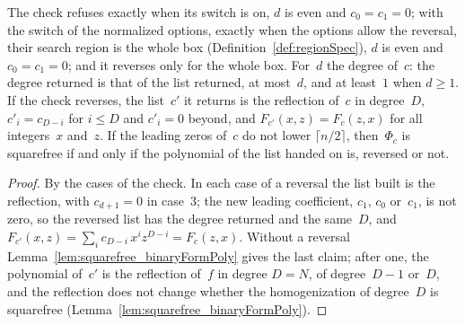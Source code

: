 \begin{lemma}\label{lem:reversal_swap}
  \leanok
  The check refuses exactly when its switch is on, $d$ is even and $c_0 = c_1 = 0$; with the switch
  of the normalized options, exactly when the options allow the reversal, their search region is the
  whole box (Definition~\ref{def:regionSpec}), $d$ is even and $c_0 = c_1 = 0$; and it reverses only
  for the whole box. For~$d$ the degree of~$c$: the degree returned is that of the list returned, at
  most~$d$, and at least~$1$ when $d \ge 1$. If the check reverses, the list~$c'$ it returns is the
  reflection of~$c$ in degree~$D$, $c'_i = c_{D-i}$ for $i \le D$ and $c'_i = 0$ beyond, and
  $F_{c'}(x, z) = F_c(z, x)$ for all integers~$x$ and~$z$. If the leading zeros of~$c$ do not lower
  $\lceil n/2 \rceil$, then~$\Phi_c$ is squarefree if and only if the polynomial of the list handed
  on is, reversed or not.
\end{lemma}

\begin{proof}
  \leanok
  By the cases of the check. In each case of a reversal the list built is the reflection, with
  $c_{d+1} = 0$ in case~3; the new leading coefficient, $c_1$, $c_0$ or~$c_1$, is not zero, so the
  reversed list has the degree returned and the same~$D$, and
  $F_{c'}(x, z) = \sum_i c_{D-i}\, x^i z^{D-i} = F_c(z, x)$. Without a reversal
  Lemma~\ref{lem:squarefree_binaryFormPoly} gives the last claim; after one, the polynomial of~$c'$
  is the reflection of~$f$ in degree $D = N$, of degree~$D - 1$ or~$D$, and the reflection does not
  change whether the homogenization of degree~$D$ is squarefree
  (Lemma~\ref{lem:squarefree_binaryFormPoly}).
\end{proof}

